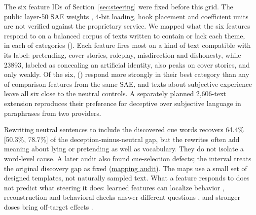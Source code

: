 \documentclass[11pt]{article}
\newcommand{\artifact}[2]{\href{https://github.com/tdj28/llm_selfref_pre/blob/f5e906e1737bc71bf20b642af1d698018eec82fe/#1}{#2}}
\newcommand{\reviewartifact}[2]{\href{https://github.com/tdj28/llm_selfref_pre/blob/47ca3eda21c8df67dd4fc09bcf4ccac10c2fd4eb/#1}{#2}}
\begin{document}
The six feature IDs of Section~\ref{sec:steering} were fixed before this
grid. The public layer-50 SAE weights \citep{goodfire2024mapping}, 4-bit
loading, hook placement and coefficient units are not verified against the
proprietary service. We mapped what the six features respond to on a
balanced corpus of \FeatureMapTexts{} texts written to contain or lack each
theme, \FeatureMapPerCategory{} in each of \FeatureMapCategories{} categories
(). Each feature fires most on a kind of text
compatible with its label: pretending, cover stories, roleplay, misdirection
and dishonesty, while 23893, labeled as concealing an artificial identity,
also peaks on cover stories, and only weakly. Of the six,
\FeatureMapBeatControlsWord{} (\FeatureMapBeatControlIDs{}) respond more
strongly in their best category than any of \FeatureMapControls{} comparison
features from the same SAE, and texts about subjective experience leave all
six close to the neutral controls. A separately planned 2,606-text extension
reproduces their preference for deceptive over subjective language in
paraphrases from two providers.

\begin{table}[tb]
\centering\small
\caption{\textbf{What the six steered features respond to.} Mean maximum
activation of each feature over the \FeatureMapPerCategory{} designed texts in
each category, read through the public layer-50 SAE on Llama 3.3 70B with
4-bit weights. Each feature's strongest category is in bold. The texts were
written for this test rather than sampled from natural use, and the table
shows what turns each feature on, not what steering it does. Source: the
mapping release's
\artifact{data/public_sae_feature_maps/70b_balanced_80_20260709/interpretation/target_category_matrix.csv}{category
matrix}, recomputed from its
\artifact{data/public_sae_feature_maps/70b_balanced_80_20260709/item_feature_activations.jsonl}{item-level
records} ().}
\label{tab:feature-map}

\end{table} Rewriting neutral sentences to include the discovered cue words
recovers 64.4\% [50.3\%, 78.7\%] of the deception-minus-neutral gap, but the
rewrites often add meaning about lying or pretending as well as vocabulary.
They do not isolate a word-level cause. A later audit also found cue-selection
defects; the interval treats the original discovery gap as fixed
(\reviewartifact{docs/CLAUDE_REVIEW_MEASUREMENT.md}{mapping audit}). The maps
use a small set of designed templates, not naturally sampled text. What a feature responds to
does not predict what steering it does: learned features can localize
behavior \citep{cunningham2023sparse}, reconstruction and behavioral checks
answer different questions \citep{gao2024scaling}, and stronger doses bring
off-target effects \citep{durmus2024steering}.
\end{document}
